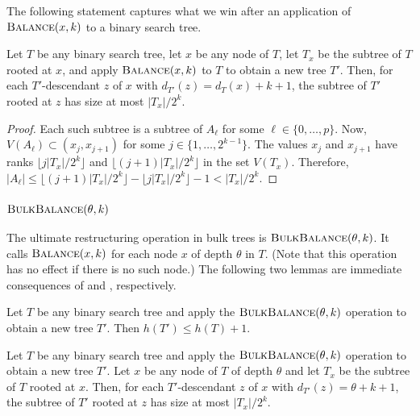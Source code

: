 \documentclass[kpfonts]{patmorin}
\let\le\leqslant
\begin{document}
The following statement captures what we win after an application of $\textsc{Balance}(x,k)$ to a binary search tree.

\begin{lem}
  Let $T$ be any binary search tree, let $x$ be any node of $T$, let $T_x$ be the subtree of $T$ rooted at $x$, and apply $\textsc{Balance}(x,k)$ to $T$ to obtain a new tree $T'$.  Then, for each $T'$-descendant $z$ of $x$ with $d_{T'}(z)=d_{T}(x)+k+1$, the subtree of $T'$ rooted at $z$ has size at most $|T_x|/2^k$.
\end{lem}

\begin{proof}
  Each such subtree is a subtree of $A_\ell$ for some $\ell\in\{0,\ldots,p\}$. Now, $V(A_\ell)\subset (x_j,x_{j+1})$ for some $j\in\{1,\ldots,2^{k-1}\}$.  The values $x_j$ and $x_{j+1}$ have ranks $\lfloor j|T_x|/2^k\rfloor$ and $\lfloor (j+1)|T_x|/2^k\rfloor$ in the set $V(T_x)$.  Therefore, $|A_\ell|\le \lfloor (j+1)|T_x|/2^k\rfloor- \lfloor j|T_x|/2^k\rfloor -1 < |T_x|/2^k$.
\end{proof}

\subsubsection{$\textsc{BulkBalance}(\theta,k)$}

The ultimate restructuring operation in bulk trees is $\textsc{BulkBalance}(\theta,k)$.
It calls $\textsc{Balance}(x,k)$ for each node $x$ of depth $\theta$ in $T$.
(Note that this operation has no effect if there is no such node.)
The following two lemmas are immediate consequences of  and , respectively.

\begin{lem}
  Let $T$ be any binary search tree and apply the $\textsc{BulkBalance}(\theta,k)$ operation to obtain a new tree $T'$.  Then $h(T')\le h(T)+1$.
\end{lem}

\begin{lem}
  Let $T$ be any binary search tree and apply the $\textsc{BulkBalance}(\theta,k)$ operation to obtain a new tree $T'$.
  Let $x$ be any node of $T$ of depth $\theta$ and let $T_x$ be the subtree of $T$ rooted at $x$.
  Then, for each $T'$-descendant $z$ of $x$ with $d_{T'}(z)=\theta+k+1$, the subtree of $T'$ rooted at $z$ has size at most $|T_x|/2^k$.
\end{lem}
\end{document}
